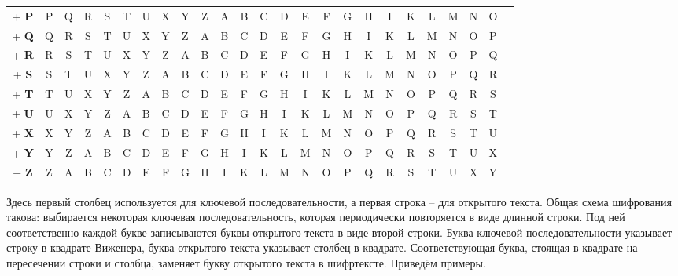 \begin{center}
{\begin{tabular}{|c|*{24}c|}
+    \textbf{P} & P & Q & R & S & T & U & X & Y & Z & A & B & C & D & E & F & G & H & I & K & L & M & N & O \\
+    \textbf{Q} & Q & R & S & T & U & X & Y & Z & A & B & C & D & E & F & G & H & I & K & L & M & N & O & P \\
+    \textbf{R} & R & S & T & U & X & Y & Z & A & B & C & D & E & F & G & H & I & K & L & M & N & O & P & Q \\
+    \textbf{S} & S & T & U & X & Y & Z & A & B & C & D & E & F & G & H & I & K & L & M & N & O & P & Q & R \\
+    \textbf{T} & T & U & X & Y & Z & A & B & C & D & E & F & G & H & I & K & L & M & N & O & P & Q & R & S \\
+    \textbf{U} & U & X & Y & Z & A & B & C & D & E & F & G & H & I & K & L & M & N & O & P & Q & R & S & T \\
+    \textbf{X} & X & Y & Z & A & B & C & D & E & F & G & H & I & K & L & M & N & O & P & Q & R & S & T & U \\
+    \textbf{Y} & Y & Z & A & B & C & D & E & F & G & H & I & K & L & M & N & O & P & Q & R & S & T & U & X \\
+    \textbf{Z} & Z & A & B & C & D & E & F & G & H & I & K & L & M & N & O & P & Q & R & S & T & U & X & Y \\
    \hline
\end{tabular} } \end{center}

Здесь первый столбец используется для ключевой последовательности, а первая строка -- для открытого текста. Общая схема шифрования такова: выбирается некоторая ключевая последовательность, которая периодически повторяется в виде длинной строки. Под ней соответственно каждой букве записываются буквы открытого текста в виде второй строки. Буква ключевой последовательности указывает строку в квадрате Виженера, буква открытого текста указывает столбец в квадрате. Соответствующая буква, стоящая в квадрате на пересечении строки и столбца, заменяет букву открытого текста в шифртексте. Приведём примеры.

